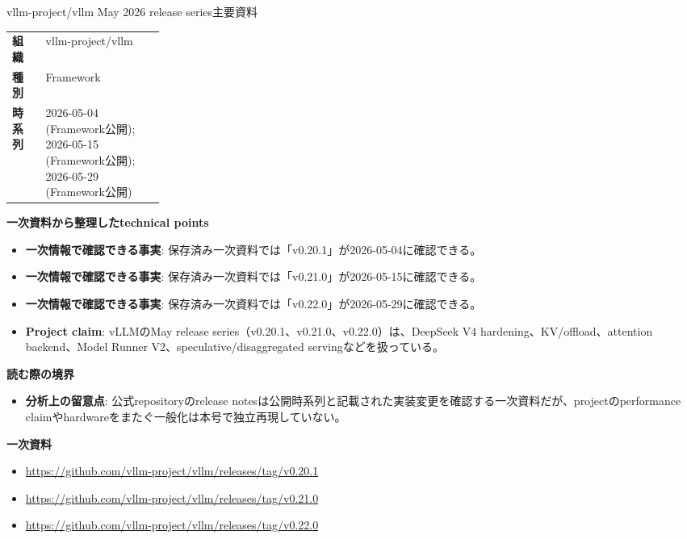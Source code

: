 \begin{technicalnote}{vllm-project/vllm May 2026 release series}{主要資料}
\begingroup
\begin{tabularx}{\linewidth}{@{}>{\bfseries}p{0.22\linewidth}X@{}}
組織 & vllm-project/vllm \\
種別 & Framework \\
時系列 & 2026-05-04 (Framework公開); 2026-05-15 (Framework公開); 2026-05-29 (Framework公開) \\
\end{tabularx}
\smallskip
{\bfseries 一次資料から整理したtechnical points}
\begin{itemize}[leftmargin=1.5em,itemsep=0.35em]
\item \textbf{一次情報で確認できる事実}: 保存済み一次資料では「v0.20.1」が2026-05-04に確認できる。
\item \textbf{一次情報で確認できる事実}: 保存済み一次資料では「v0.21.0」が2026-05-15に確認できる。
\item \textbf{一次情報で確認できる事実}: 保存済み一次資料では「v0.22.0」が2026-05-29に確認できる。
\end{itemize}
\begin{minipage}{\linewidth}
\begin{itemize}[leftmargin=1.5em,itemsep=0.35em]
\item \textbf{Project claim}: vLLMのMay release series（v0.20.1、v0.21.0、v0.22.0）は、DeepSeek V4 hardening、KV/offload、attention backend、Model Runner V2、speculative/disaggregated servingなどを扱っている。
\end{itemize}
{\bfseries 読む際の境界}
\begin{itemize}[leftmargin=1.5em,itemsep=0.35em]
\item \textbf{分析上の留意点}: 公式repositoryのrelease notesは公開時系列と記載された実装変更を確認する一次資料だが、projectのperformance claimやhardwareをまたぐ一般化は本号で独立再現していない。
\end{itemize}
\begin{samepage}
{\bfseries 一次資料}
\begingroup\sloppy
\begin{itemize}[leftmargin=1.5em,itemsep=0.25em]
\item {\scriptsize\url{https://github.com/vllm-project/vllm/releases/tag/v0.20.1}}
\item {\scriptsize\url{https://github.com/vllm-project/vllm/releases/tag/v0.21.0}}
\item {\scriptsize\url{https://github.com/vllm-project/vllm/releases/tag/v0.22.0}}
\end{itemize}
\endgroup
\end{samepage}
\end{minipage}
\endgroup
\end{technicalnote}
\medskip

